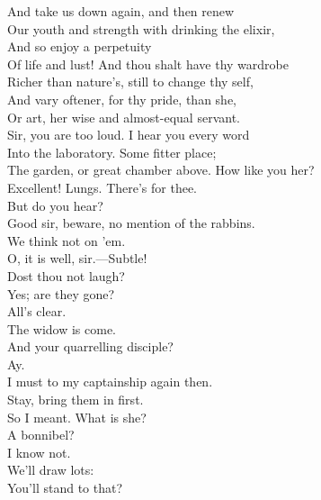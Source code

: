 \documentclass[a4paper,oneside]{memoir}
\begin{document}
\begin{drama*}
And take us down again, and then renew\\
Our youth and strength with drinking the elixir,\\
And so enjoy a perpetuity\\
Of life and lust! And thou shalt have thy wardrobe\\
Richer than nature's, still to change thy self,\\
And vary oftener, for thy pride, than she,\\
Or art, her wise and almost-equal servant.\\
\facespeaks Sir, you are too loud. I hear you every word\\
Into the laboratory. Some fitter place;\\
The garden, or great chamber above. How like you her?\\
\mammonspeaks Excellent! Lungs. There's for thee.\\
\facespeaks {} But do you hear?\\
Good sir, beware, no mention of the rabbins.\\
\mammonspeaks We think not on 'em.\\
\facespeaks {} O, it is well, sir.---Subtle!\\
Dost thou not laugh?\\
\subtlespeaks {} Yes; are they gone?\\
\facespeaks {} All's clear.\\
\subtlespeaks The widow is come.\\
\facespeaks {} And your quarrelling disciple?\\
\subtlespeaks Ay.\\
\facespeaks {} I must to my captainship again then.\\
\subtlespeaks Stay, bring them in first.\\
\facespeaks {} So I meant. What is she?\\
A bonnibel?\\
\subtlespeaks {} I know not.\\
\facespeaks {} We'll draw lots:\\
You'll stand to that?\\

\end{drama*}
\end{document}
